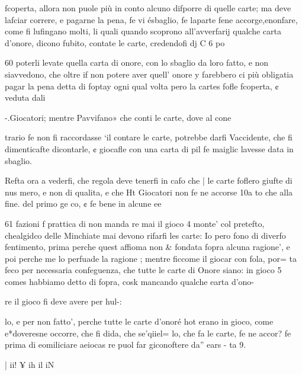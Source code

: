 \documentclass[11pt,a6paper]{article}
\begin{document}
fcoperta, allora non puole più 
in conto alcuno difporre di
quelle carte; ma deve lafciar
correre, e pagarne la pena, fe vi
ésbaglio, fe laparte fene accorge,enonfare, come fi lufingano molti, li quali quando
scoprono all’avverfarij qualche
carta d’onore, dicono fubito,
contate le carte, credendofi dj
C 6 po 

 

 

  

60
poterli levate quella carta di
onore, con lo sbaglio da loro
fatto, e non siavvedono, che
oltre if non potere aver quell’
onore y farebbero ci più obligatia pagar la pena detta di foptay
ogni qual volta pero la cartes
fofle fcoperta, ¢ veduta dali

-.Giocatori; mentre Pavvifano»
che conti le carte, dove al cone

trario fe non fi raccordasse ‘il
contare le carte, potrebbe darfi
Vaccidente, che fi dimenticafte
dicontarle, ¢ giocafle con una
carta di pil fe maiglic lavesse
data in sbaglio.

Refta ora a vederfi, che regola deve tenerfi in cafo che |
le carte foflero giufte di nus
mero, e non di qualita, e che Ht
Giocatori non fe ne accorse 10a
to che alla fine. del primo ge
co, ¢ fe bene in alcune ee
 

61
fazioni f prattica di non manda
re mai il gioco 4 monte’ col pretefto, chealgidco delle Minchiate mai devono rifarfi les
carte: Io pero fono di diverfo
fentimento, prima perche quest
affioma non & fondata fopra alcuna ragione’, e poi perche me
lo perfuade la ragione ; mentre
ficcome il giocar con fola, por=
ta feco per necessaria confeguenza, che tutte le carte di
Onore siano: in gioco 5 comes
habbiamo detto di fopra, cosk
mancando qualche earta d’ono-~

re il gioco fi deve avere per hul-:

lo, e per non fatto’, perche tutte le carte d’onoré hot erano
in gioco, come e*doveresne
occorre, che fi dida, che se'qiiel=
lo, che fa le carte, fe ne accor?
fe prima di eomiliciare aeiocas
re puol far giconoftere da” ears
- ta 9.

 

 
  

 

 

|
ii!
¥
ih
il
iN

 

 

 

 
\end{document}
